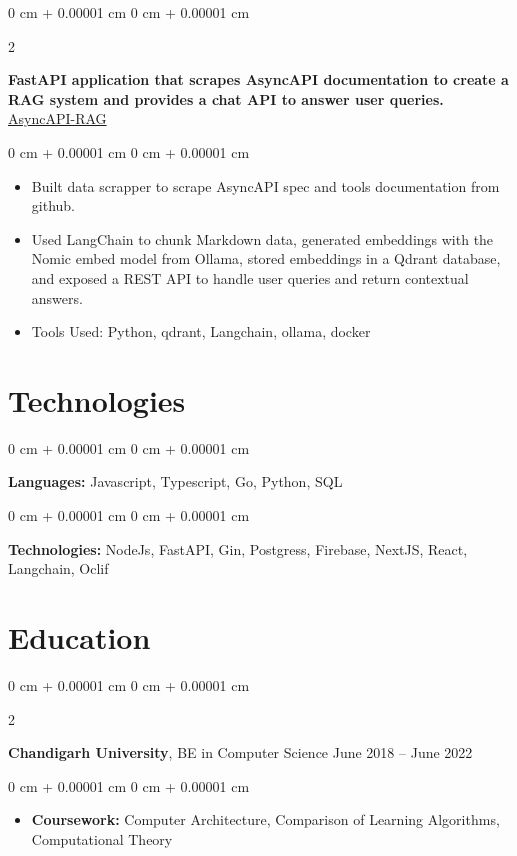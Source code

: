 \documentclass[10pt, letterpaper]{article}
\newenvironment{highlights}{
    \begin{itemize}[
        topsep=0.10 cm,
        parsep=0.10 cm,
        partopsep=0pt,
        itemsep=0pt,
        leftmargin=0 cm + 10pt
    ]
}{
    \end{itemize}
} %
\newenvironment{onecolentry}{
    \begin{adjustwidth}{
        0 cm + 0.00001 cm
    }{
        0 cm + 0.00001 cm
    }
}{
    \end{adjustwidth}
} %
\newenvironment{twocolentry}[2][]{
    \onecolentry
    \def\secondColumn{#2}
    \setcolumnwidth{\fill, 4.5 cm}
    \begin{paracol}{2}
}{
    \switchcolumn \raggedleft \secondColumn
    \end{paracol}
    \endonecolentry
} %
\begin{document}
        \begin{twocolentry}{
            \href{https://github.com/Souvikns/asyncapi-rag}{AsyncAPI-RAG}
        }
            \textbf{FastAPI application that scrapes AsyncAPI documentation to create a RAG system and provides a chat API to answer user queries.}\end{twocolentry}

        \vspace{0.10 cm}
        \begin{onecolentry}
            \begin{highlights}
                \item Built data scrapper to scrape AsyncAPI spec and tools documentation from github.
                \item Used LangChain to chunk Markdown data, generated embeddings with the Nomic embed model from Ollama, stored embeddings in a Qdrant database, and exposed a REST API to handle user queries and return contextual answers.
                \item Tools Used: Python, qdrant, Langchain, ollama, docker 
                
            \end{highlights}
        \end{onecolentry}

    
    \section{Technologies}



        
        \begin{onecolentry}
            \textbf{Languages:} Javascript, Typescript, Go, Python, SQL
        \end{onecolentry}

        \vspace{0.2 cm}

        \begin{onecolentry}
            \textbf{Technologies:} NodeJs, FastAPI, Gin, Postgress, Firebase, NextJS, React, Langchain, Oclif 
        \end{onecolentry}

    
    \section{Education}

        
        \begin{twocolentry}{
            June 2018 – June 2022
        }
            \textbf{Chandigarh University}, BE in Computer Science\end{twocolentry}

        \vspace{0.10 cm}
        \begin{onecolentry}
            \begin{highlights}
                \item \textbf{Coursework:} Computer Architecture, Comparison of Learning Algorithms, Computational Theory
            \end{highlights}
        \end{onecolentry}



    
\end{document}
